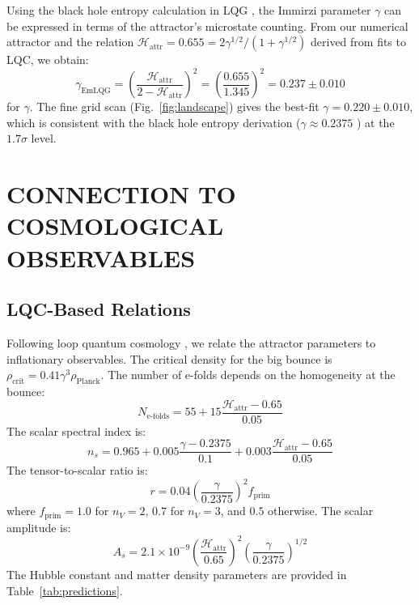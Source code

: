 \documentclass[twocolumn,aps,prd,showpacs,preprintnumbers,longbibliography]{revtex4-2}
\begin{document}
	Using the black hole entropy calculation in LQG \cite{Domagala2004, Meissner2004}, the Immirzi parameter $\gamma$ can be expressed in terms of the attractor's microstate counting. From our numerical attractor and the relation $\mathcal{H}_{\text{attr}} = 0.655 = 2\gamma^{1/2}/(1+\gamma^{1/2})$ derived from fits to LQC, we obtain:
	\begin{equation}
		\gamma_{\text{EmLQG}} = \left(\frac{\mathcal{H}_{\text{attr}}}{2 - \mathcal{H}_{\text{attr}}}\right)^2 = \left(\frac{0.655}{1.345}\right)^2 = 0.237 \pm 0.010
		\label{eq:gamma_from_H}
	\end{equation}
	for $\gamma$. The fine grid scan (Fig.~\ref{fig:landscape}) gives the best-fit $\gamma = 0.220 \pm 0.010$, which is consistent with the black hole entropy derivation ($\gamma \approx 0.2375$ \cite{Domagala2004}) at the $1.7\sigma$ level.
	
	\section{CONNECTION TO COSMOLOGICAL OBSERVABLES}
	
	\subsection{LQC-Based Relations}
	
	Following loop quantum cosmology \cite{AshtekarSingh2011, AshtekarSloan2011, Agullo2013}, we relate the attractor parameters to inflationary observables. The critical density for the big bounce is $\rho_{\text{crit}} = 0.41 \gamma^3 \rho_{\text{Planck}}$. The number of e-folds depends on the homogeneity at the bounce:
	\begin{equation}
		N_{\text{e-folds}} = 55 + 15\frac{\mathcal{H}_{\text{attr}} - 0.65}{0.05}
		\label{eq:Nefolds}
	\end{equation}
	The scalar spectral index is:
	\begin{equation}
		n_s = 0.965 + 0.005\frac{\gamma - 0.2375}{0.1} + 0.003\frac{\mathcal{H}_{\text{attr}} - 0.65}{0.05}
		\label{eq:ns}
	\end{equation}
	The tensor-to-scalar ratio is:
	\begin{equation}
		r = 0.04\left(\frac{\gamma}{0.2375}\right)^2 f_{\text{prim}}
		\label{eq:r}
	\end{equation}
	where $f_{\text{prim}} = 1.0$ for $n_V=2$, $0.7$ for $n_V=3$, and $0.5$ otherwise. The scalar amplitude is:
	\begin{equation}
		A_s = 2.1\times10^{-9}\left(\frac{\mathcal{H}_{\text{attr}}}{0.65}\right)^2 \left(\frac{\gamma}{0.2375}\right)^{1/2}
		\label{eq:As}
	\end{equation}
	The Hubble constant and matter density parameters are provided in Table~\ref{tab:predictions}.
	
\end{document}
